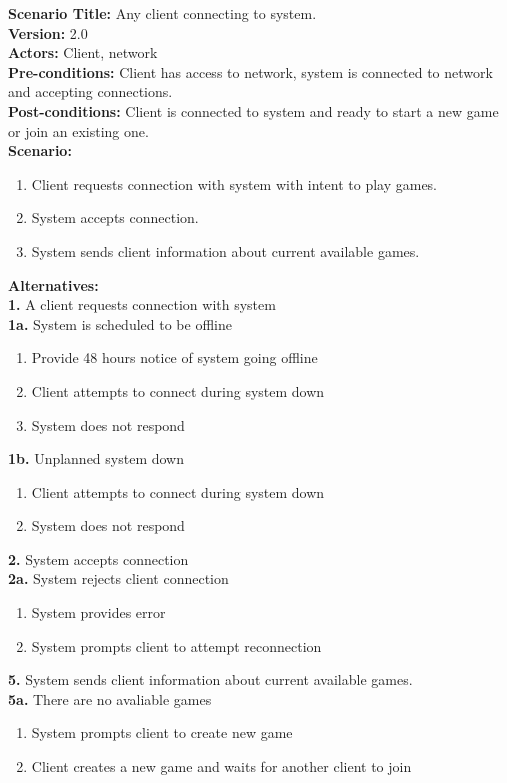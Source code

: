 \documentclass[letterpaper,12pt]{article}
\begin{document}
\noindent \textbf{Scenario Title:} Any client connecting to system.\\
\textbf{Version:} 2.0\\
\textbf{Actors:} Client, network\\
\textbf{Pre-conditions:} Client has access to network, system is connected to network and accepting connections.\\
\textbf{Post-conditions:} Client is connected to system and ready to start a new game or join an existing one.\\
\textbf{Scenario:}
\begin{enumerate}
   \item Client requests connection with system with intent to play games.
   \item System accepts connection.
   \item System sends client information about current available games.
\end{enumerate}
\textbf{Alternatives:}\\
\textbf{1.} A client requests connection with system\\
\textbf{1a.} System is scheduled to be offline
\begin{enumerate}
\item Provide 48 hours notice of system going offline
\item Client attempts to connect during system down
\item System does not respond
\end{enumerate}
\textbf{1b.} Unplanned system down
\begin{enumerate}
\item Client attempts to connect during system down
\item System does not respond
\end{enumerate}
\textbf{2.} System accepts connection\\
\textbf{2a.} System rejects client connection
\begin{enumerate}
\item System provides error
\item System prompts client to attempt reconnection
\end{enumerate}
\textbf{5.} System sends client information about current available games.\\
\textbf{5a.} There are no avaliable games
\begin{enumerate}
\item System prompts client to create new game
\item Client creates a new game and waits for another client to join
\end{enumerate}
\end{document}

